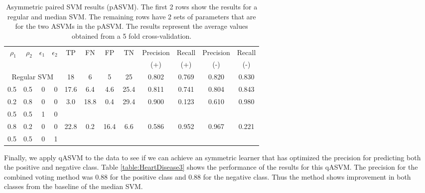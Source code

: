 \documentclass[twoside,11pt]{article}
\begin{document}
\begin{table}[htbp]\label{table:HeartDisease2}
  \centering
    \begin{tabular}{rrrr|cccccccc}
    \hline
        \multirow{2}{*}{$\rho_1$} & \multirow{2}{*}{$\rho_2$} & \multirow{2}{*}{$\epsilon_1$} & \multirow{2}{*}{$\epsilon_2$} & \multirow{2}{*}{TP}    & \multirow{2}{*}{FN}    & \multirow{2}{*}{FP}    & \multirow{2}{*}{TN} & Precision & Recall & Precision & Recall\\
    &&&&&&&&  (+) &  (+) &  (-) &  (-) \bigstrut\\
    \hline
    \hline
   \multicolumn{4}{c|}{Regular SVM} & 18    & 6     & 5     & 25    & 0.802 & 0.769 & 0.820 & 0.830 \bigstrut\\
    \hline
    0.5   & 0.5   & 0     & 0     & 17.6  & 6.4   & 4.6   & 25.4  & 0.811 & 0.741 & 0.804 & 0.843 \bigstrut\\
    \hline
    0.2   & 0.8   & 0     & 0     & 3.0   & 18.8  & 0.4   & 29.4  & 0.900 & 0.123 & 0.610 & 0.980 \bigstrut[t]\\
    0.5   & 0.5   & 1     & 0     &       &       &       &       &       &       &       &  \bigstrut[b]\\
    \hline
    0.8   & 0.2   & 0     & 0     & 22.8  & 0.2   & 16.4  & 6.6   & 0.586 & 0.952 & 0.967 & 0.221 \bigstrut[t]\\
    0.5   & 0.5   & 0     & 1     &       &       &       &       &       &       &       &  \bigstrut[b]\\
    \hline
    \hline
    \end{tabular}%
    \caption{Asymmetric paired SVM results (pASVM). The first 2 rows show the results for a regular and median SVM. The remaining rows have 2 sets of parameters that are for the two ASVMs in the pASVM. The results represent the average values obtained from a 5 fold cross-validation.}
\end{table}%

Finally, we apply qASVM to the data to see if we can achieve an symmetric learner that has optimized the precision for predicting both the positive and negative class. Table \ref{table:HeartDisease3} shows the performance of the results for this qASVM. The precision for the combined voting method was 0.88 for the positive class and 0.88 for the negative class. Thus the method shows improvement in both classes from the baseline of the median SVM.
\end{document}
